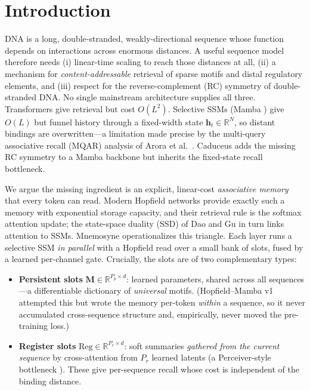 \documentclass[10pt,journal]{IEEEtran}
\newcommand{\R}{\mathbb{R}}
\begin{document}
\section{Introduction}
DNA is a long, double-stranded, weakly-directional sequence whose function
depends on interactions across enormous distances. A useful sequence model
therefore needs (i) linear-time scaling to reach those distances at all, (ii) a
mechanism for \emph{content-addressable} retrieval of sparse motifs and distal
regulatory elements, and (iii) respect for the reverse-complement (RC) symmetry
of double-stranded DNA. No single mainstream architecture supplies all three.
Transformers give retrieval but cost $O(L^2)$. Selective SSMs (Mamba
\cite{gu2023mamba}) give $O(L)$ but funnel history through a fixed-width state
$\bm h_t\in\R^{N}$, so distant bindings are overwritten---a limitation made
precise by the multi-query associative recall (MQAR) analysis of Arora et
al.\ \cite{arora2023zoology}. Caduceus \cite{schiff2024caduceus} adds the missing
RC symmetry to a Mamba backbone but inherits the fixed-state recall bottleneck.

We argue the missing ingredient is an explicit, linear-cost \emph{associative
memory} that every token can read. Modern Hopfield networks
\cite{ramsauer2021hopfield} provide exactly such a memory with exponential
storage capacity, and their retrieval rule is the softmax attention update; the
state-space duality (SSD) of Dao and Gu \cite{dao2024ssd} in turn links attention
to SSMs. Mnemosyne operationalizes this triangle. Each layer runs a selective SSM
\emph{in parallel} with a Hopfield read over a small bank of slots, fused by a
learned per-channel gate. Crucially, the slots are of two complementary types:

\begin{itemize}
\item \textbf{Persistent slots} $\bm M\in\R^{P_p\times d}$: learned parameters,
shared across all sequences---a differentiable dictionary of \emph{universal}
motifs. (Hopfield--Mamba v1 attempted this but wrote the memory per-token
\emph{within} a sequence, so it never accumulated cross-sequence structure and,
empirically, never moved the pre-training loss.)
\item \textbf{Register slots} $\mathrm{Reg}\in\R^{P_r\times d}$: soft summaries
\emph{gathered from the current sequence} by cross-attention from $P_r$ learned
latents (a Perceiver-style bottleneck \cite{jaegle2021perceiver}). These give
per-sequence recall whose cost is independent of the binding distance.
\end{itemize}
\end{document}
